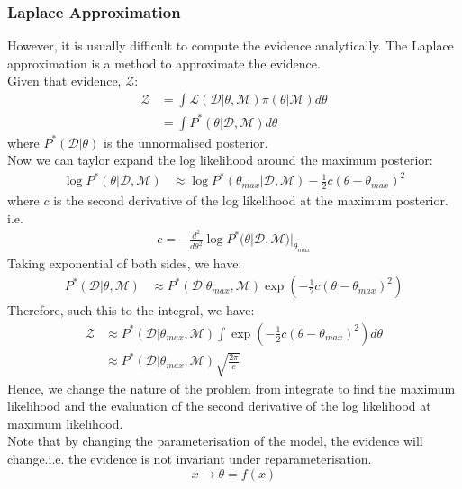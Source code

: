 \documentclass[12pt,a4paper]{article}
\begin{document}
\subsubsection{Laplace Approximation}
However, it is usually difficult to compute the evidence analytically. The Laplace approximation is a method to approximate the evidence.\\
Given that evidence, $\mathcal{Z}$:
\begin{align*}
    \mathcal{Z} &= \int \mathcal{L}(\mathcal{D}|\theta, \mathcal{M}){\pi}(\theta|\mathcal{M}) d\theta\\
    &= \int P^{*}(\theta|\mathcal{D}, \mathcal{M}) d\theta
\end{align*}
where $P^{*}(\mathcal{D}|\theta)$ is the unnormalised posterior.\\
Now we can taylor expand the log likelihood around the maximum posterior:
\begin{align*}
    \log P^{*}(\theta|\mathcal{D}, \mathcal{M}) &\approx \log P^{*}(\theta_{max}|\mathcal{D}, \mathcal{M}) - \frac{1}{2}c(\theta - \theta_{max})^2
\end{align*}
where $c$ is the second derivative of the log likelihood at the maximum posterior.\\
i.e.
\begin{align*}
    c =  -\frac{d^2}{d\theta^2} \log P^{*}(\theta|\mathcal{D}, \mathcal{M})|_{\theta_{max}}
\end{align*}
Taking exponential of both sides, we have:
\begin{align*}
    P^{*}(\mathcal{D}|\theta, \mathcal{M}) &\approx P^{*}(\mathcal{D}|\theta_{max}, \mathcal{M}) \exp\left(-\frac{1}{2}c(\theta - \theta_{max})^2\right)
\end{align*}
Therefore, such this to the integral, we have:
\begin{align*}
    \mathcal{Z} &\approx P^{*}(\mathcal{D}|\theta_{max}, \mathcal{M}) \int \exp\left(-\frac{1}{2}c(\theta - \theta_{max})^2\right) d\theta\\
    &\approx P^{*}(\mathcal{D}|\theta_{max}, \mathcal{M}) \sqrt{\frac{2\pi}{c}}
\end{align*}
Hence, we change the nature of the problem from integrate to find the maximum likelihood and the evaluation of the second derivative of the log likelihood at maximum likelihood.\\

Note that by changing the parameterisation of the model, the evidence will change.i.e. the evidence is not invariant under reparameterisation.\\
$$
    x \rightarrow \theta = f(x)
$$
\end{document}
